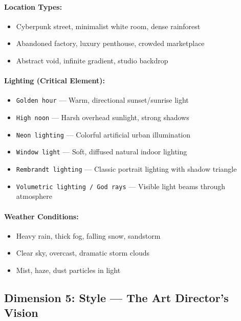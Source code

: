 \paragraph{Location Types:}
\begin{itemize}
    \item Cyberpunk street, minimalist white room, dense rainforest
    \item Abandoned factory, luxury penthouse, crowded marketplace
    \item Abstract void, infinite gradient, studio backdrop
\end{itemize}

\paragraph{Lighting (Critical Element):}
\begin{itemize}
    \item \texttt{Golden hour} --- Warm, directional sunset/sunrise light
    \item \texttt{High noon} --- Harsh overhead sunlight, strong shadows
    \item \texttt{Neon lighting} --- Colorful artificial urban illumination
    \item \texttt{Window light} --- Soft, diffused natural indoor lighting
    \item \texttt{Rembrandt lighting} --- Classic portrait lighting with shadow triangle
    \item \texttt{Volumetric lighting / God rays} --- Visible light beams through atmosphere
\end{itemize}

\paragraph{Weather Conditions:}
\begin{itemize}
    \item Heavy rain, thick fog, falling snow, sandstorm
    \item Clear sky, overcast, dramatic storm clouds
    \item Mist, haze, dust particles in light
\end{itemize}

\subsection{Dimension 5: Style --- The Art Director's Vision}
\label{subsec:dim-style}

